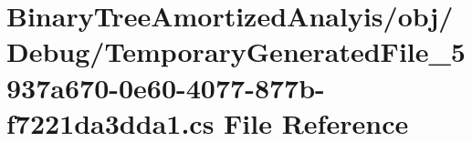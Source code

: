 \hypertarget{_binary_tree_amortized_analyis_2obj_2_debug_2_temporary_generated_file__5937a670-0e60-4077-877b-f7221da3dda1_8cs}{}\section{Binary\+Tree\+Amortized\+Analyis/obj/\+Debug/\+Temporary\+Generated\+File\+\_\+5937a670-\/0e60-\/4077-\/877b-\/f7221da3dda1.cs File Reference}
\label{_binary_tree_amortized_analyis_2obj_2_debug_2_temporary_generated_file__5937a670-0e60-4077-877b-f7221da3dda1_8cs}
